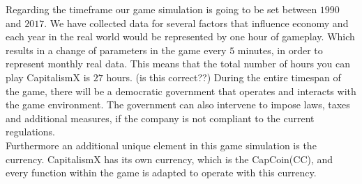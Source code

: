 \documentclass[11pt,titlepage,oneside,openany]{book}
\begin{document}
Regarding the timeframe our game simulation is going to be set between $1990$ and $2017$. We have collected data for several factors that influence economy and each year in the real world would be represented by one hour of gameplay. Which results in a change of parameters in the game every $5$ minutes, in order to represent monthly real data. This means that the total number of hours you can play CapitalismX is $27$ hours. (is this correct??)
During the entire timespan of the game, there will be a democratic government that operates and interacts with the game environment. The government can also intervene to impose laws, taxes and additional measures, if the company is not compliant to the current regulations. \\
Furthermore an additional unique element in this game simulation is the currency. CapitalismX has its own currency, which is the CapCoin(CC), and every function within the game is adapted to operate with this currency.
\end{document}
